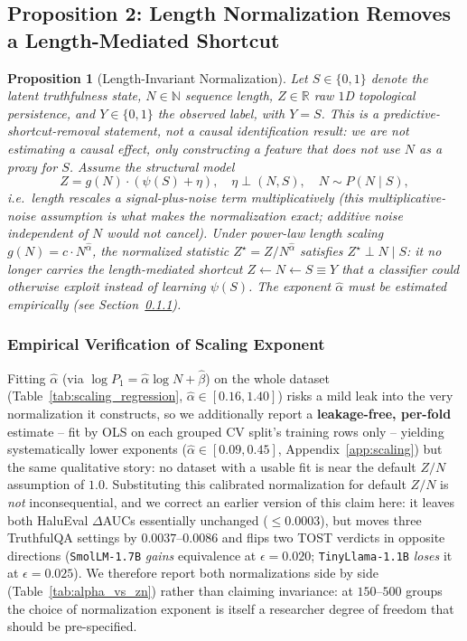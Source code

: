 \documentclass{article}
\newtheorem{proposition}{Proposition}
\begin{document}
\subsection{Proposition 2: Length Normalization Removes a Length-Mediated Shortcut}
\begin{proposition}[Length-Invariant Normalization]
\label{prop:dag}
Let $S \in \{0, 1\}$ denote the latent truthfulness state, $N \in \mathbb{N}$ sequence length, $Z \in \mathbb{R}$ raw $1$D topological persistence, and $Y \in \{0, 1\}$ the observed label, with $Y=S$. This is a predictive-shortcut-removal statement, not a causal identification result: we are not estimating a causal effect, only constructing a feature that does not use $N$ as a proxy for $S$. Assume the structural model
\begin{equation}
    Z = g(N) \cdot (\psi(S) + \eta), \quad \eta \perp (N, S), \quad N \sim P(N \mid S),
\end{equation}
i.e.\ length rescales a signal-plus-noise term multiplicatively (this multiplicative-noise assumption is what makes the normalization exact; additive noise independent of $N$ would not cancel). Under power-law length scaling $g(N) = c \cdot N^{\hat{\alpha}}$, the normalized statistic $Z^\star = Z / N^{\hat{\alpha}}$ satisfies $Z^\star \perp N \mid S$: it no longer carries the length-mediated shortcut $Z \leftarrow N \leftarrow S \equiv Y$ that a classifier could otherwise exploit instead of learning $\psi(S)$. The exponent $\hat{\alpha}$ must be estimated empirically (see Section~\ref{sec:prop3_verification}).
\end{proposition}

\subsubsection{Empirical Verification of Scaling Exponent}
\label{sec:prop3_verification}
Fitting $\hat{\alpha}$ (via $\log P_1 = \hat{\alpha}\log N+\hat\beta$) on the whole dataset (Table~\ref{tab:scaling_regression}, $\hat\alpha \in [0.16,1.40]$) risks a mild leak into the very normalization it constructs, so we additionally report a \textbf{leakage-free, per-fold} estimate -- fit by OLS on each grouped CV split's training rows only -- yielding systematically lower exponents ($\hat\alpha \in [0.09, 0.45]$, Appendix~\ref{app:scaling}) but the same qualitative story: no dataset with a usable fit is near the default $Z/N$ assumption of $1.0$. Substituting this calibrated normalization for default $Z/N$ is \emph{not} inconsequential, and we correct an earlier version of this claim here: it leaves both HaluEval $\Delta$AUCs essentially unchanged ($\le 0.0003$), but moves three TruthfulQA settings by $0.0037$--$0.0086$ and flips two TOST verdicts in opposite directions (\texttt{SmolLM-1.7B} \emph{gains} equivalence at $\epsilon{=}0.020$; \texttt{TinyLlama-1.1B} \emph{loses} it at $\epsilon{=}0.025$). We therefore report both normalizations side by side (Table~\ref{tab:alpha_vs_zn}) rather than claiming invariance: at $150$--$500$ groups the choice of normalization exponent is itself a researcher degree of freedom that should be pre-specified.
\end{document}
